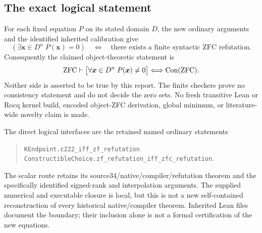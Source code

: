 \subsection{The exact logical statement}
For each fixed equation $P$ on its stated domain $D$, the new ordinary arguments and the identified inherited calibration give
\[
 (\exists \boldsymbol{x}\in D^n\;P(\boldsymbol{x})=0)
 \quad\Longleftrightarrow\quad
 \text{there exists a finite syntactic ZFC refutation}.
\]
Consequently the claimed object-theoretic statement is
\[
 \mathrm{ZFC}\vdash
 \bigl[\forall\boldsymbol{x}\in D^n\;P(\boldsymbol{x})\ne0\bigr]
 \Longleftrightarrow\operatorname{Con}(\mathrm{ZFC}).
\]
Neither side is asserted to be true by this report. The finite checkers prove no consistency statement and do not decide the zero sets. No fresh transitive Lean or Rocq kernel build, encoded object-ZFC derivation, global minimum, or literature-wide novelty claim is made.

The direct logical interfaces are the retained named ordinary statements
\begin{quote}\small
\nolinkurl{KEndpoint.c222_iff_zf_refutation}\\
\nolinkurl{ConstructibleChoice.zf_refutation_iff_zfc_refutation}.
\end{quote}
The scalar route retains its source34/native/compiler/refutation theorem and the specifically identified signed-rank and interpolation arguments. The supplied numerical and executable closure is local, but this is not a new self-contained reconstruction of every historical native/compiler theorem. Inherited Lean files document the boundary; their inclusion alone is not a formal certification of the new equations.

